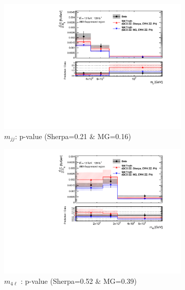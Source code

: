 \begin{figure}[!htb]
    \centering
    \begin{subfigure}{.49\textwidth}
        \centering
        \includegraphics[width=.98\linewidth]{figures/Results/CrossSection_VBSSuppressed/xs_mjj_CR.pdf}
        \caption{ \footnotesize{$m_{jj}$}: p-value (Sherpa=0.21 $\&$ MG=0.16)}
    \end{subfigure}
    \begin{subfigure}{.49\textwidth}
        \centering
        \includegraphics[width=.98\linewidth]{figures/Results/CrossSection_VBSSuppressed/xs_m4l_CR.pdf}
        \caption{ \footnotesize{$m_{4\ell}$ }: p-value (Sherpa=0.52 $\&$ MG=0.39)}
    \end{subfigure}\\
    \begin{subfigure}{.49\textwidth}

\end{subfigure}
\end{figure}
